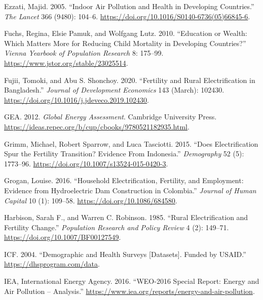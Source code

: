 \documentclass[
]{article}
\newlength{\cslhangindent}
\newlength{\cslentryspacingunit} %
\newenvironment{CSLReferences}[2] %
 {%
  \setlength{\parindent}{0pt}
  \ifodd #1
  \let\oldpar\par
  \def\par{\hangindent=\cslhangindent\oldpar}
  \fi
  \setlength{\parskip}{#2\cslentryspacingunit}
 }%
 {}
\begin{document}
\begin{CSLReferences}{1}{0}
\leavevmode{}%
Ezzati, Majid. 2005. {``Indoor Air Pollution and Health in Developing Countries.''} \emph{The Lancet} 366 (9480): 104--6. \url{https://doi.org/10.1016/S0140-6736(05)66845-6}.

\leavevmode{}%
Fuchs, Regina, Elsie Pamuk, and Wolfgang Lutz. 2010. {``Education or Wealth: Which Matters More for Reducing Child Mortality in Developing Countries?''} \emph{Vienna Yearbook of Population Research} 8: 175--99. \url{https://www.jstor.org/stable/23025514}.

\leavevmode{}%
Fujii, Tomoki, and Abu S. Shonchoy. 2020. {``Fertility and Rural Electrification in {Bangladesh}.''} \emph{Journal of Development Economics} 143 (March): 102430. \url{https://doi.org/10.1016/j.jdeveco.2019.102430}.

\leavevmode{}%
GEA. 2012. \emph{Global {Energy} {Assessment}}. Cambridge University Press. \url{https://ideas.repec.org/b/cup/cbooks/9780521182935.html}.

\leavevmode{}%
Grimm, Michael, Robert Sparrow, and Luca Tasciotti. 2015. {``Does {Electrification} {Spur} the {Fertility} {Transition}? {Evidence} {From} {Indonesia}.''} \emph{Demography} 52 (5): 1773--96. \url{https://doi.org/10.1007/s13524-015-0420-3}.

\leavevmode{}%
Grogan, Louise. 2016. {``Household {Electrification}, {Fertility}, and {Employment}: {Evidence} from {Hydroelectric} {Dam} {Construction} in {Colombia}.''} \emph{Journal of Human Capital} 10 (1): 109--58. \url{https://doi.org/10.1086/684580}.

\leavevmode{}%
Harbison, Sarah F., and Warren C. Robinson. 1985. {``Rural Electrification and Fertility Change.''} \emph{Population Research and Policy Review} 4 (2): 149--71. \url{https://doi.org/10.1007/BF00127549}.

\leavevmode{}%
ICF. 2004. {``Demographic and {Health} {Surveys} {[}{Datasets}{]}. {Funded} by {USAID}.''} \url{https://dhsprogram.com/data}.

\leavevmode{}%
IEA, International Energy Agency. 2016. {``{WEO}-2016 {Special} {Report}: {Energy} and {Air} {Pollution} -- {Analysis}.''} \url{https://www.iea.org/reports/energy-and-air-pollution}.


\end{CSLReferences}
\end{document}

